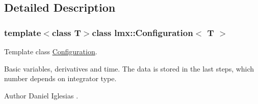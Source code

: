 \subsection{Detailed Description}
\subsubsection*{template$<$class T$>$class lmx\-::\-Configuration$<$ T $>$}

Template class \hyperlink{classlmx_1_1Configuration}{Configuration}. 

Basic variables, derivatives and time. The data is stored in the last steps, which number depends on integrator type.

\begin{DoxyAuthor}{Author}
Daniel Iglesias . 
\end{DoxyAuthor}


